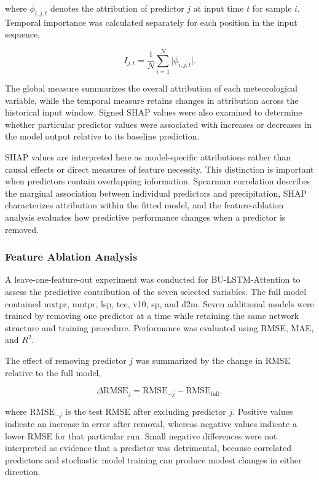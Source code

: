 \documentclass[referee,pdflatex,sn-basic]{sn-jnl}%
\theoremstyle{thmstyleone}%
\theoremstyle{thmstyletwo}%
\theoremstyle{thmstylethree}%
\begin{document}
where $\phi_{i,j,t}$ denotes the attribution of predictor $j$ at input time $t$ for sample $i$. Temporal importance was calculated separately for each position in the input sequence,

\begin{equation}
I_{j,t} =
\frac{1}{N}
\sum_{i=1}^{N}
\lvert
\phi_{i,j,t}
\rvert.
\label{eq:temporal_shap}
\end{equation}

The global measure summarizes the overall attribution of each meteorological variable, while the temporal measure retains changes in attribution across the historical input window. Signed SHAP values were also examined to determine whether particular predictor values were associated with increases or decreases in the model output relative to its baseline prediction.

SHAP values are interpreted here as model-specific attributions rather than causal effects or direct measures of feature necessity. This distinction is important when predictors contain overlapping information. Spearman correlation describes the marginal association between individual predictors and precipitation, SHAP characterizes attribution within the fitted model, and the feature-ablation analysis evaluates how predictive performance changes when a predictor is removed.

\subsubsection{Feature Ablation Analysis}
\label{sec:feature_ablation}

A leave-one-feature-out experiment was conducted for BU-LSTM-Attention to assess the predictive contribution of the seven selected variables. The full model contained mxtpr, mntpr, lsp, tcc, v10, sp, and d2m. Seven additional models were trained by removing one predictor at a time while retaining the same network structure and training procedure. Performance was evaluated using RMSE, MAE, and $R^2$.

The effect of removing predictor $j$ was summarized by the change in RMSE relative to the full model,

\begin{equation}
\Delta \mathrm{RMSE}_j
=
\mathrm{RMSE}_{-j}
-
\mathrm{RMSE}_{\mathrm{full}},
\label{eq:delta_rmse}
\end{equation}

where $\mathrm{RMSE}_{-j}$ is the test RMSE after excluding predictor $j$. Positive values indicate an increase in error after removal, whereas negative values indicate a lower RMSE for that particular run. Small negative differences were not interpreted as evidence that a predictor was detrimental, because correlated predictors and stochastic model training can produce modest changes in either direction.
\end{document}
